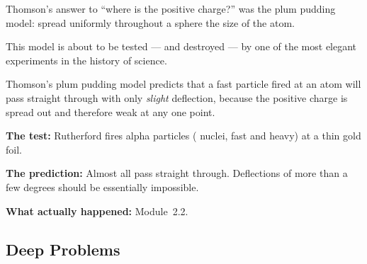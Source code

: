\documentclass[12pt, a4paper]{book}
\theoremstyle{definition}
\begin{document}
Thomson's answer to ``where is the positive charge?''
was the plum pudding model: spread uniformly throughout
a sphere the size of the atom.

This model is about to be tested --- and destroyed ---
by one of the most elegant experiments in the history of science.

\begin{modelbreaks}
Thomson's plum pudding model predicts that a fast particle
fired at an atom will pass straight through with only
\emph{slight} deflection, because the positive charge
is spread out and therefore weak at any one point.

\textbf{The test:} Rutherford fires alpha particles
( nuclei, fast and heavy) at a thin gold foil.

\textbf{The prediction:} Almost all pass straight through.
Deflections of more than a few degrees should be essentially
impossible.

\textbf{What actually happened:} Module~2.2.
\end{modelbreaks}

\subsection*{Deep Problems}
\end{document}

